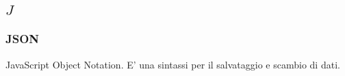 \subsection*{\quad$J\quad$}
\subsubsection*{JSON}
JavaScript Object Notation. E’ una sintassi per il salvataggio e scambio di dati.

